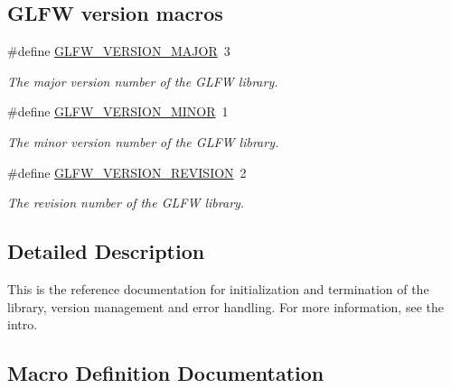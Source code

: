 \subsection*{G\+L\+F\+W version macros}
\begin{DoxyCompactItemize}
\item 
\#define \hyperlink{group__init_ga6337d9ea43b22fc529b2bba066b4a576}{G\+L\+F\+W\+\_\+\+V\+E\+R\+S\+I\+O\+N\+\_\+\+M\+A\+J\+O\+R}~3
\begin{DoxyCompactList}\small\item\em The major version number of the G\+L\+F\+W library. \end{DoxyCompactList}\item 
\#define \hyperlink{group__init_gaf80d40f0aea7088ff337606e9c48f7a3}{G\+L\+F\+W\+\_\+\+V\+E\+R\+S\+I\+O\+N\+\_\+\+M\+I\+N\+O\+R}~1
\begin{DoxyCompactList}\small\item\em The minor version number of the G\+L\+F\+W library. \end{DoxyCompactList}\item 
\#define \hyperlink{group__init_gab72ae2e2035d9ea461abc3495eac0502}{G\+L\+F\+W\+\_\+\+V\+E\+R\+S\+I\+O\+N\+\_\+\+R\+E\+V\+I\+S\+I\+O\+N}~2
\begin{DoxyCompactList}\small\item\em The revision number of the G\+L\+F\+W library. \end{DoxyCompactList}\end{DoxyCompactItemize}


\subsection{Detailed Description}
This is the reference documentation for initialization and termination of the library, version management and error handling. For more information, see the intro. 

\subsection{Macro Definition Documentation}
\hypertarget{group__init_ga6337d9ea43b22fc529b2bba066b4a576}{}
